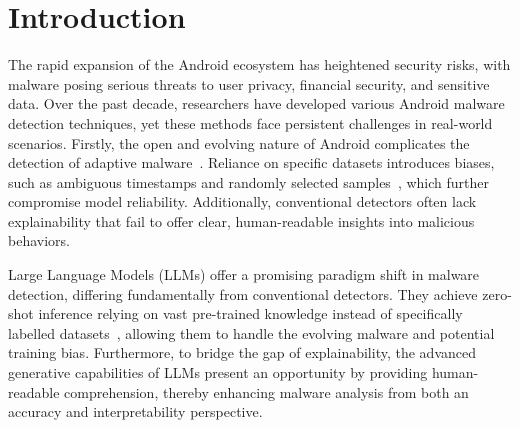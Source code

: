 \section{Introduction}
The rapid expansion of the Android ecosystem has heightened security risks, with malware posing serious threats to user privacy, financial security, and sensitive data. Over the past decade, researchers have developed various Android malware detection techniques, yet these methods face persistent challenges in real-world scenarios. 
Firstly, the open and evolving nature of Android complicates the detection of adaptive malware~\cite{transcend, transcending}. 
Reliance on specific datasets introduces biases, such as ambiguous timestamps and randomly selected samples~\cite{tesseract}, which further compromise model reliability. 
Additionally, conventional detectors often lack explainability that fail to offer clear, human-readable insights into malicious behaviors.

Large Language Models (LLMs) offer a promising paradigm shift in malware detection, differing fundamentally from conventional detectors. They achieve zero-shot inference relying on vast pre-trained knowledge instead of specifically labelled datasets~\cite{large_zero,toolformer}, allowing them to handle the evolving malware and potential training bias. 
Furthermore, to bridge the gap of explainability, the advanced generative capabilities of LLMs present an opportunity by providing human-readable comprehension, thereby enhancing malware analysis from both an accuracy and interpretability perspective.


